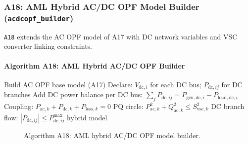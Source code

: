 \subsubsection{A18: AML Hybrid AC/DC OPF Model Builder (\texttt{acdcopf\_builder})}
\label{algo:a18}

\texttt{A18} extends the AC OPF model of A17 with DC network variables and
VSC converter linking constraints.

\paragraph{Algorithm A18: AML Hybrid AC/DC OPF Builder}
\begin{algorithmic}[1]
  \State Build AC OPF base model (A17)
  \State Declare: $V_{\mathrm{dc},i}$ for each DC bus; $P_{\mathrm{dc},ij}$ for DC branches
  \State Add DC power balance per DC bus:
    $\sum_j P_{\mathrm{dc},ij} = P_{\mathrm{gen,dc},i} - P_{\mathrm{load,dc},i}$
    \State Coupling: $P_{\mathrm{ac},k} + P_{\mathrm{dc},k} + P_{\mathrm{loss},k} = 0$
    \State PQ circle: $P_{\mathrm{ac},k}^2 + Q_{\mathrm{ac},k}^2 \le S_{\mathrm{vsc},k}^2$
    \State DC branch flow: $|P_{\mathrm{dc},ij}| \le P_{\mathrm{dc},ij}^{\max}$
  \EndFor
  \State \Return hybrid model
\EndProcedure
\end{algorithmic}

\begin{figure}[H]
\centering
{}
\caption{Algorithm A18: AML hybrid AC/DC OPF model builder.}
\label{fig:a18-flow}
\end{figure}

